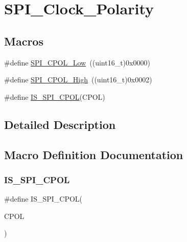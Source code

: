 \hypertarget{group___s_p_i___clock___polarity}{}\section{S\+P\+I\+\_\+\+Clock\+\_\+\+Polarity}
\label{group___s_p_i___clock___polarity}
\subsection*{Macros}
\begin{DoxyCompactItemize}
\item 
\#define \mbox{\hyperlink{group___s_p_i___clock___polarity_ga3dbc0234c4b4e7c37137e7c189f3c085}{S\+P\+I\+\_\+\+C\+P\+O\+L\+\_\+\+Low}}~((uint16\+\_\+t)0x0000)
\item 
\#define \mbox{\hyperlink{group___s_p_i___clock___polarity_ga4431f2edf42f8298d5bbe693351edbb0}{S\+P\+I\+\_\+\+C\+P\+O\+L\+\_\+\+High}}~((uint16\+\_\+t)0x0002)
\item 
\#define \mbox{\hyperlink{group___s_p_i___clock___polarity_gafc1cc5b1ff7e801a409a7a1e6047acf9}{I\+S\+\_\+\+S\+P\+I\+\_\+\+C\+P\+OL}}(C\+P\+OL)
\end{DoxyCompactItemize}


\subsection{Detailed Description}


\subsection{Macro Definition Documentation}
\mbox{\label{group___s_p_i___clock___polarity_gafc1cc5b1ff7e801a409a7a1e6047acf9}} 
\subsubsection{\texorpdfstring{IS\_SPI\_CPOL}{IS\_SPI\_CPOL}}
{\footnotesize\ttfamily \#define I\+S\+\_\+\+S\+P\+I\+\_\+\+C\+P\+OL(\begin{DoxyParamCaption}\item[{}]{C\+P\+OL }\end{DoxyParamCaption})}

